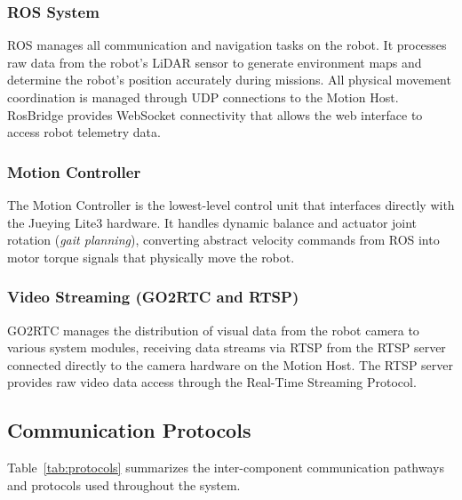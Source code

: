 \documentclass[conference]{IEEEtran}
\begin{document}
\subsubsection{ROS System}
ROS manages all communication and navigation tasks on the robot. It processes raw data from the robot's LiDAR sensor to generate environment maps and determine the robot's position accurately during missions. All physical movement coordination is managed through UDP connections to the Motion Host. RosBridge provides WebSocket connectivity that allows the web interface to access robot telemetry data.

\subsubsection{Motion Controller}
The Motion Controller is the lowest-level control unit that interfaces directly with the Jueying Lite3 hardware. It handles dynamic balance and actuator joint rotation (\textit{gait planning}), converting abstract velocity commands from ROS into motor torque signals that physically move the robot.

\subsubsection{Video Streaming (GO2RTC and RTSP)}
GO2RTC manages the distribution of visual data from the robot camera to various system modules, receiving data streams via RTSP from the RTSP server connected directly to the camera hardware on the Motion Host. The RTSP server provides raw video data access through the Real-Time Streaming Protocol.

\subsection{Communication Protocols}
Table~\ref{tab:protocols} summarizes the inter-component communication pathways and protocols used throughout the system.
\end{document}

